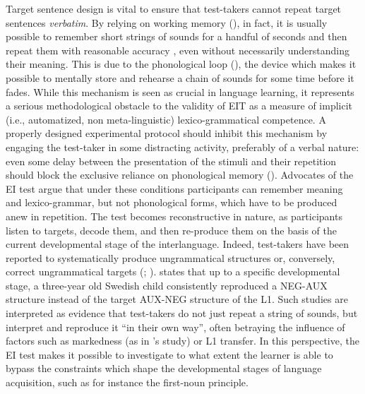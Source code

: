 Target sentence design is vital to ensure that test-takers cannot repeat target sentences \textit{verbatim}. By relying on working memory (\citealt{Baddeley1986, Baddeley2003}), in fact, it is usually possible to remember short strings of sounds for a handful of seconds and then repeat them with reasonable accuracy \citep{Sachs1967}, even without necessarily understanding their meaning. This is due to the phonological loop (\citealt{BaddeleyEtAl1998}), the device which makes it possible to mentally store and rehearse a chain of sounds for some time before it fades. While this mechanism is seen as crucial in language learning, it represents a serious methodological obstacle to the validity of EIT as a measure of implicit (i.e., automatized, non meta-linguistic) lexico-grammatical competence. A properly designed experimental protocol should inhibit this mechanism by engaging the test-taker in some distracting activity, preferably of a verbal nature: even some delay between the presentation of the stimuli and their repetition should block the exclusive reliance on phonological memory (\citealt{JuffsHarrington2011}). Advocates of the EI test argue that under these conditions participants can remember meaning and lexico-grammar, but not phonological forms, which have to be produced anew in repetition. The test becomes reconstructive in nature, as participants listen to targets, decode them, and then re-produce them on the basis of the current developmental stage of the interlanguage. Indeed, test-takers have been reported to systematically produce ungrammatical structures or, conversely, correct ungrammatical targets (\citealt{HamayanEtAl1977}; \citealt{MunnichEtAl1994}). \citet{Håkansson1989} states that up to a specific developmental stage, a three-year old Swedish child consistently reproduced a NEG-AUX structure instead of the target AUX-NEG structure of the L1. Such studies are interpreted as evidence that test-takers do not just repeat a string of sounds, but interpret and reproduce it “in their own way”, often betraying the influence of factors such as markedness (as in \citeauthor{Håkansson1989}’s study) or L1 transfer. In this perspective, the EI test makes it possible to investigate to what extent the learner is able to bypass the constraints which shape the developmental stages of language acquisition, such as for instance the first-noun principle. 

